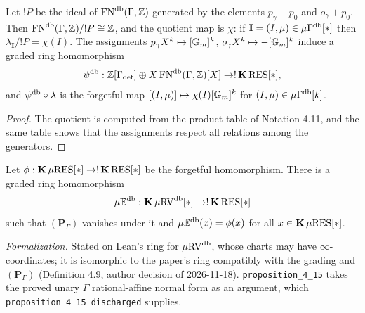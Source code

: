 \setcounter{theorem}{13}
\begin{remark}
\label{db-gam-res}
\leanok
{}
Let $!P$ be the ideal of $\operatorname{FN}^{\operatorname{db}}(\Gamma, \mathbb{Z})$ generated by the elements $p_\gamma - p_0$ and $o_\gamma + p_0$. Then $\operatorname{FN}^{\operatorname{db}}(\Gamma, \mathbb{Z}) / !P \cong \mathbb{Z}$, and the quotient map is $\chi$: if $\mathbf{I} = (I, \mu) \in \mu\Gamma^{\operatorname{db}}[*]$ then $\lambda_{\mathbf{I}} / !P = \chi(I)$. The assignments $p_\gamma X^k \mapsto [\mathbb{G}_m]^k$, $o_\gamma X^k \mapsto -[\mathbb{G}_m]^k$ induce a graded ring homomorphism \[ \psi^{\operatorname{db}} : \mathbb{Z}[\Gamma_{\mathrm{def}}] \oplus X \operatorname{FN}^{\operatorname{db}}(\Gamma, \mathbb{Z})[X] \to !\operatorname{\mathbf{K}} \mathrm{RES}[*], \] and $\psi^{\operatorname{db}} \circ \lambda$ is the forgetful map $[(I, \mu)] \mapsto \chi(I) [\mathbb{G}_m]^k$ for $(I, \mu) \in \mu\Gamma^{\operatorname{db}}[k]$.
\end{remark}

\begin{proof}
\leanok
The quotient is computed from the product table of Notation 4.11, and the same table shows that the assignments respect all relations among the generators.
\end{proof}

\setcounter{theorem}{14}
\begin{proposition}
\label{prop-eu-retr-k-db}
\leanok
{}
Let $\phi : \operatorname{\mathbf{K}} \mu\mathrm{RES}[*] \to !\operatorname{\mathbf{K}} \mathrm{RES}[*]$ be the forgetful homomorphism. There is a graded ring homomorphism \[ \mu\mathbb{E}^{\operatorname{db}} : \operatorname{\mathbf{K}} \mu\mathrm{RV}^{\operatorname{db}}[*] \to !\operatorname{\mathbf{K}} \mathrm{RES}[*] \] such that $(\mathbf{P}_\Gamma)$ vanishes under it and $\mu\mathbb{E}^{\operatorname{db}}(x) = \phi(x)$ for all $x \in \operatorname{\mathbf{K}} \mu\mathrm{RES}[*]$.

\emph{Formalization.} Stated on Lean's ring for $\mu\mathrm{RV}^{\operatorname{db}}$, whose charts may have $\infty$-coordinates; it is isomorphic to the paper's ring compatibly with the grading and $(\mathbf{P}_\Gamma)$ (Definition 4.9, author decision of 2026-11-18). \texttt{proposition\_4\_15} takes the proved unary $\Gamma$ rational-affine normal form as an argument, which \texttt{proposition\_4\_15\_discharged} supplies.
\end{proposition}

